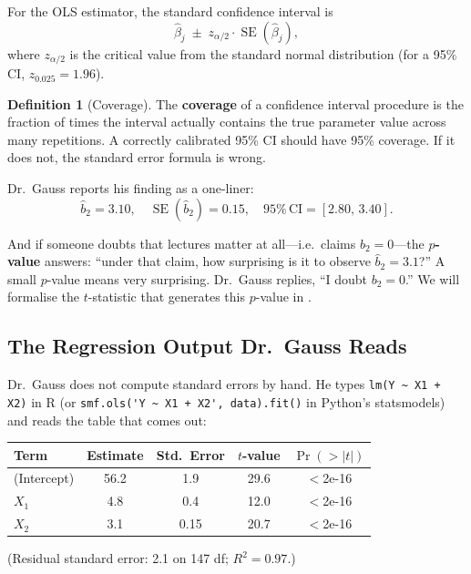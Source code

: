 \documentclass[11pt,a4paper]{article}
\theoremstyle{definition}
\newtheorem{definition}{Definition}[section]
\theoremstyle{plain}
\theoremstyle{remark}
\newcommand{\se}{\operatorname{SE}}
\newcommand{\bhat}{\hat{\beta}}
\begin{document}
For the OLS estimator, the standard confidence interval is
\begin{equation}\label{eq:ci}
  \bhat_j \;\pm\; z_{\alpha/2} \cdot \se(\bhat_j),
\end{equation}
where $z_{\alpha/2}$ is the critical value from the standard normal distribution (for a 95\% CI, $z_{0.025} = 1.96$).

\begin{definition}[Coverage]\label{def:coverage}
The \textbf{coverage} of a confidence interval procedure is the fraction of times the interval actually contains the true parameter value across many repetitions. A correctly calibrated 95\% CI should have 95\% coverage. If it does not, the standard error formula is wrong.
\end{definition}

Dr.\ Gauss reports his finding as a one-liner:
\[
  \hat b_2 = 3.10, \quad \se(\hat b_2) = 0.15, \quad 95\%\,\text{CI} = [2.80,\, 3.40].
\]

And if someone doubts that lectures matter at all---i.e.\ claims $b_2 = 0$---the \textbf{$p$-value} answers: ``under that claim, how surprising is it to observe $\hat b_2 = 3.1$?'' A small $p$-value means very surprising. Dr.\ Gauss replies, ``I doubt $b_2 = 0$.'' We will formalise the $t$-statistic that generates this $p$-value in .

\subsection{The Regression Output Dr.\ Gauss Reads}\label{subsec:regout}

Dr.\ Gauss does not compute standard errors by hand. He types \verb|lm(Y ~ X1 + X2)| in R (or \verb|smf.ols('Y ~ X1 + X2', data).fit()| in Python's statsmodels) and reads the table that comes out:

\begin{center}
\begin{tabular}{@{}lcccc@{}}
\toprule
Term & Estimate & Std.\ Error & $t$-value & $\Pr(>|t|)$ \\
\midrule
(Intercept) & 56.2 & 1.9 & 29.6 & $<$2e-16 \\
$X_1$ & 4.8 & 0.4 & 12.0 & $<$2e-16 \\
$X_2$ & 3.1 & 0.15 & 20.7 & $<$2e-16 \\
\bottomrule
\end{tabular}
\end{center}
\noindent (Residual standard error: 2.1 on 147 df; $R^2 = 0.97$.)
\end{document}
